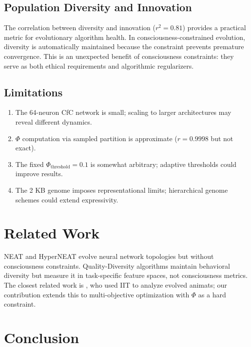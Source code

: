 \documentclass[11pt,a4paper]{article}
\begin{document}
\subsection{Population Diversity and Innovation}

The correlation between diversity and innovation ($r^2 = 0.81$) provides a practical metric for evolutionary algorithm health. In consciousness-constrained evolution, diversity is automatically maintained because the constraint prevents premature convergence. This is an unexpected benefit of consciousness constraints: they serve as both ethical requirements and algorithmic regularizers.

\subsection{Limitations}

\begin{enumerate}[nosep]
    \item The 64-neuron CfC network is small; scaling to larger architectures may reveal different dynamics.
    \item $\Phi$ computation via sampled partition is approximate ($r = 0.9998$ but not exact).
    \item The fixed $\Phi_{\text{threshold}} = 0.1$ is somewhat arbitrary; adaptive thresholds could improve results.
    \item The 2 KB genome imposes representational limits; hierarchical genome schemes could extend expressivity.
\end{enumerate}

\section{Related Work}

NEAT \citep{stanley2002} and HyperNEAT \citep{stanley2009} evolve neural network topologies but without consciousness constraints. Quality-Diversity algorithms \citep{mouret2015} maintain behavioral diversity but measure it in task-specific feature spaces, not consciousness metrics. The closest related work is \citet{albantakis2014}, who used IIT to analyze evolved animats; our contribution extends this to multi-objective optimization with $\Phi$ as a hard constraint.

\section{Conclusion}
\end{document}
